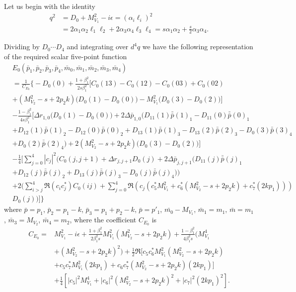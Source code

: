 Let us begin with the identity
\begin{align}
q^2&=D_0+M_{V_1}^2-i\epsilon=(\alpha_i\ell_i)^2\nonumber\\
&=2\alpha_1\alpha_2\ell_1\ell_2+2\alpha_3\alpha_4\ell_3\ell_4=s\alpha_1\alpha_2+\frac{s}{2}\alpha_3\alpha_4.
\end{align}

Dividing by $D_0\cdots D_4$ and integrating over $d^4q$ we have the following representation of the required scalar five-point function
\begin{align}
&E_0(\bar{p}_1,\bar{p}_2,\bar{p}_3,\bar{p}_4,\bar{m}_0,\bar{m}_1,\bar{m}_2,\bar{m}_3,\bar{m}_4)\nonumber\\
&=\frac{1}{C_{E_0}}\biggl\{-D_0(0)+\frac{1+\beta_1^2}{2s\beta_1^2}\bigg[C_0(13)-C_0(12)-C_0(03)+C_0(02)\nonumber\\
&+(M_{V_2}^2-s+2p_2k) 
\bigg(D_0(1)-D_0(0)\bigg)-M^2_{V_1}\bigg(D_0(3)-D_0(2)\bigg)    \bigg]   \nonumber\\
&-\frac{1-\beta_1^2}{4s\beta_1^2}\bigg[\Delta r_{1,0}\bigg(D_0(1)-D_0(0)\bigg)+2\Delta\bar{p}_{1,0}\bigg( D_{11}(1)\bar{\bar{p}}(1)_1-D_{11}(0)\bar{\bar{p}}(0)_1\nonumber\\&+D_{12}(1)\bar{\bar{p}}(1)_2-D_{12}(0)\bar{\bar{p}}(0)_2+D_{13}(1)\bar{\bar{p}}(1)_3-D_{13}(2)\bar{\bar{p}}(2)_3-D_{0}(3)\bar{\bar{p}}(3)_4\nonumber\\
& +D_{0}(2)\bar{\bar{p}}(2)_4 \bigg) +2(M_{V_2}^2-s+2p_2k)\bigg(D_0(3)-D_0(2)\bigg) \bigg]  \nonumber\\
&-\frac{1}{4}\bigg[\sum_{j=0}^{4}|c_j|^2\bigg(C_0(j,j+1)+\Delta r_{j,j+1}D_0(j)+2\Delta\bar{p}_{j,j+1} (D_{11}(j)\bar{\bar{p}}(j)_1 \nonumber\\
&+D_{12}(j)\bar{\bar{p}}(j)_2+D_{13}(j)\bar{\bar{p}}(j)_3-D_{0}(j)\bar{\bar{p}}(j)_4   ) \bigg)  \nonumber\\
&+2\bigg( \sum_{i>j}^{4}\Re(c_ic^\ast_j)C_0(ij)+\sum_{j=0}^{4}\Re(c_j(c_5^\ast M_{V_1}^2+c_6^\ast(M^2_{V_2}-s+2p_2k)+c_7^\ast(2kp_1))  )\nonumber\\
&D_0(j) \bigg)\bigg]\biggr\}
\end{align}
where
$\bar{p}=p_1$, $\bar{p}_2=p_1-k$, $\bar{p}_3=p_1+p_2-k$, $\bar{p}=p'_1$, $\bar{m_0}-M_{V_1}$, $\bar{m}_1=m_1$, $\bar{m}=m_1$, $\bar{m}_3=M_{V_2}$, $\bar{m}_4=m_2$,
where the coefficient $C_{E_0}$ is 
\begin{align}
C_{E_0}=&M^2_{V_1}-i\epsilon+\frac{1+\beta_1^2}{2\beta_1^2s}M^2_{V_1}(M^2_{V_2}-s+2p_2k)+\frac{1-\beta_1^2}{4\beta_1^2s}(M^4_{V_1} \nonumber\\
&+(M^2_{V_2}-s+2p_2k)^2)+\frac{1}{2}\Re[c_5c_6^\ast M^2_{V_1}(M_{V_2}^2-s+2p_2k)  \nonumber\\
&+c_5c_7^\ast M^2_{V_1}(2kp_1)  +c_6c_7^\ast(M^2_{V_2}-s+2p_2k)(2kp_1)  ]\nonumber\\
&+\frac{1}{4}[|c_5|^2M^4_{V_1}+|c_6|^2(M_{V_2}^2-s+2p_2k)^2+|c_7|^2(2kp_1)^2].
\end{align}
